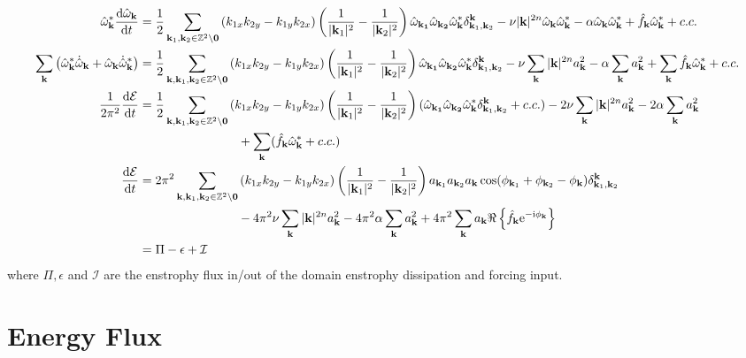 \documentclass[9pt]{article}
\newcommand{\der}[2]{\frac{\mathrm{d}#1}{\mathrm{d}#2}}          	 %
\newcommand{\ii}{\mathrm{i}}      								  %
\newcommand{\e}{\mathrm{e}}      								  %
\newcommand{\omegahat}[1]{\hat{\omega}_{ \mathbf{#1} } }								%
\newcommand{\bfk}{\mathbf{k}}								%
\newcommand{\bfkn}[1]{\mathbf{k}_{#1}}								%
\begin{document}
\begin{align}
	\omegahat{k}^*\der{\omegahat{k}}{t} &= \frac{1}{2}	\sum_{\mathbf{k}_1, \mathbf{k}_2\in \mathbb{Z}^2\setminus \mathbf{0}}\left(k_{1x}k_{2y} - k_{1y}k_{2x}\right) \left(\frac{1}{|\bfkn{1}|^2} - \frac{1}{|\bfkn{2}|^2}\right) \omegahat{\bfkn{1}}\omegahat{\bfkn{2}}\omegahat{k}^* \delta_{\bfkn{1}, \bfkn{2}}^{\bfk} - \nu |\bfk|^{2n}\omegahat{k}\omegahat{k}^* - \alpha\omegahat{k}\omegahat{k}^* + \hat{f}_{\bfk} \omegahat{k}^* + c. c. \notag \\
	\sum_{\bfk}\left(\omegahat{k}^*\dot{\hat{\omega}}_\bfk + \omegahat{k}\dot{\hat{\omega}}^*_\bfk\right)&= \frac{1}{2}	\sum_{\bfk, \mathbf{k}_1, \mathbf{k}_2\in \mathbb{Z}^2\setminus \mathbf{0}}\left(k_{1x}k_{2y} - k_{1y}k_{2x}\right) \left(\frac{1}{|\bfkn{1}|^2} - \frac{1}{|\bfkn{2}|^2}\right) \omegahat{\bfkn{1}}\omegahat{\bfkn{2}}\omegahat{k}^* \delta_{\bfkn{1}, \bfkn{2}}^{\bfk} - \nu \sum_{\bfk}|\bfk|^{2n} a_{\bfk}^2 - \alpha\sum_{\bfk} a_{\bfk}^2 + \sum_{\bfk}\hat{f}_{\bfk} \omegahat{k}^* + c. c. \notag \\
	\frac{1}{2\pi^2}\der{\mathcal{E}}{t} &= \frac{1}{2}	\sum_{\bfk, \mathbf{k}_1, \mathbf{k}_2\in \mathbb{Z}^2\setminus \mathbf{0}}\left(k_{1x}k_{2y} - k_{1y}k_{2x}\right) \left(\frac{1}{|\bfkn{1}|^2} - \frac{1}{|\bfkn{2}|^2}\right) (\omegahat{\bfkn{1}}\omegahat{\bfkn{2}}\omegahat{k}^* \delta_{\bfkn{1}, \bfkn{2}}^{\bfk} + c.c.) - 2\nu \sum_{\bfk}|\bfk|^{2n} a_{\bfk}^2 - 2\alpha\sum_{\bfk} a_{\bfk}^2 \notag \\
	&\qquad \qquad \qquad \qquad+ \sum_{\bfk}(\hat{f}_{\bfk} \omegahat{k}^* + c. c.)\notag \\
	\der{\mathcal{E}}{t} &= 2\pi^2	\sum_{\bfk, \mathbf{k}_1, \mathbf{k}_2\in \mathbb{Z}^2\setminus \mathbf{0}}\left(k_{1x}k_{2y} - k_{1y}k_{2x}\right) \left(\frac{1}{|\bfkn{1}|^2} - \frac{1}{|\bfkn{2}|^2}\right) a_{\bfkn{1}} a_{\bfkn{2}} a_{\bfk} \cos(\phi_{\bfkn{1}} + \phi_{\bfkn{2}} - \phi_{\bfk}) \delta_{\bfkn{1}, \bfkn{2}}^{\bfk} \notag \\ & \qquad \qquad \qquad \qquad- 4\pi^2\nu \sum_{\bfk}|\bfk|^{2n} a_{\bfk}^2 - 4\pi^2\alpha\sum_{\bfk} a_{\bfk}^2 + 4\pi^2\sum_{\bfk}a_\bfk\Re\left\{\hat{f}_{\bfk} \e^{-\ii\phi_\bfk}\right\} \notag \\
	&= \Pi - \epsilon + \mathcal{I}
\end{align}
where $\Pi, \epsilon$ and $\mathcal{I}$ are the enstrophy flux in/out of the domain enstrophy dissipation and forcing input.


\section{Energy Flux}
\end{document}
